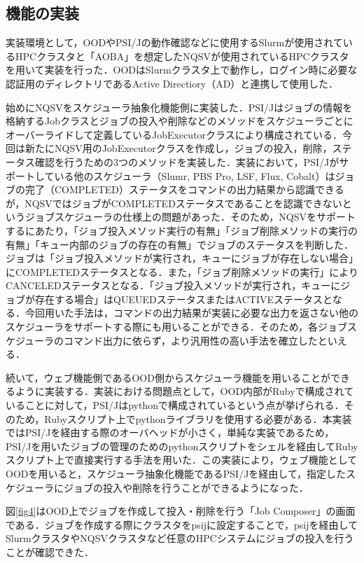 \documentclass[a4paper,oneside,twocolumn,notitlepage,dvipdfmx]{jsarticle}
\begin{document}
\subsection{機能の実装}
実装環境として，OODやPSI/Jの動作確認などに使用するSlurmが使用されているHPCクラスタと「AOBA」を想定したNQSVが使用されているHPCクラスタを用いて実装を行った．OODはSlurmクラスタ上で動作し，ログイン時に必要な認証用のディレクトリであるActive Directiory（AD）と連携して使用した．\par
始めにNQSVをスケジューラ抽象化機能側に実装した．PSI/Jはジョブの情報を格納するJobクラスとジョブの投入や削除などのメソッドをスケジューラごとにオーバーライドして定義しているJobExecutorクラスにより構成されている．今回は新たにNQSV用のJobExecutorクラスを作成し，ジョブの投入，削除，ステータス確認を行うための3つのメソッドを実装した．実装において，PSI/Jがサポートしている他のスケジューラ（Slumr, PBS Pro, LSF, Flux, Cobalt）はジョブの完了（COMPLETED）ステータスをコマンドの出力結果から認識できるが，NQSVではジョブがCOMPLETEDステータスであることを認識できないというジョブスケジューラの仕様上の問題があった．そのため，NQSVをサポートするにあたり，「ジョブ投入メソッド実行の有無」「ジョブ削除メソッドの実行の有無」「キュー内部のジョブの存在の有無」でジョブのステータスを判断した．ジョブは「ジョブ投入メソッドが実行され，キューにジョブが存在しない場合」にCOMPLETEDステータスとなる．また，「ジョブ削除メソッドの実行」によりCANCELEDステータスとなる．「ジョブ投入メソッドが実行され，キューにジョブが存在する場合」はQUEUEDステータスまたはACTIVEステータスとなる．今回用いた手法は，コマンドの出力結果が実装に必要な出力を返さない他のスケジューラをサポートする際にも用いることができる．そのため，各ジョブスケジューラのコマンド出力に依らず，より汎用性の高い手法を確立したといえる．\par
続いて，ウェブ機能側であるOOD側からスケジューラ機能を用いることができるように実装する．実装における問題点として，OOD内部がRubyで構成されていることに対して，PSI/Jはpythonで構成されているという点が挙げられる．そのため，Rubyスクリプト上でpythonライブラリを使用する必要がある．本実装ではPSI/Jを経由する際のオーバヘッドが小さく，単純な実装であるため，PSI/Jを用いたジョブの管理のためのpythonスクリプトをシェルを経由してRubyスクリプト上で直接実行する手法を用いた．この実装により，ウェブ機能としてOODを用いると，スケジューラ抽象化機能であるPSI/Jを経由して，指定したスケジューラにジョブの投入や削除を行うことができるようになった．\par
図\ref{fig4}はOOD上でジョブを作成して投入・削除を行う「Job Composer」の画面である．ジョブを作成する際にクラスタをpsijに設定することで，psijを経由してSlurmクラスタやNQSVクラスタなど任意のHPCシステムにジョブの投入を行うことが確認できた．\par
\end{document}
